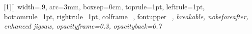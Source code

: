 
%			
%
[1][]{
    width=.9\textwidth,
    arc=3mm,
    boxsep=0cm,
    toprule=1pt,
    leftrule=1pt,
    bottomrule=1pt,
    rightrule=1pt,
    colframe=\TitlePageColor,
    fontupper=\raggedleft\fontsize{16pt}{14pt}\itshape,
    breakable,
    nobeforeafter,
    enhanced jigsaw,
    opacityframe=0.3,
    opacityback=0.7
}

